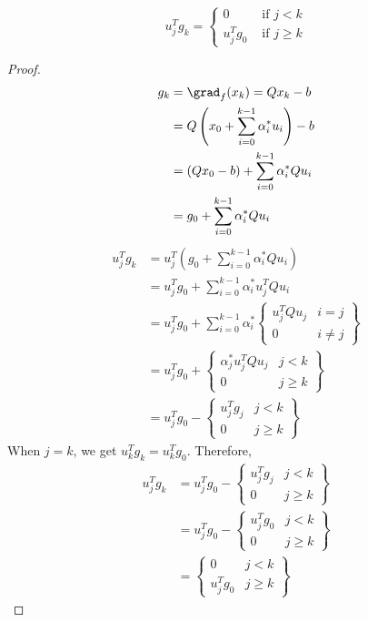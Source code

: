 \begin{theorem}
\label{thm:ug}
\[ u_j^T g_k = \begin{cases}0 & \textrm{ if } j < k \\ u_j^Tg_0 & \textrm{ if } j \ge k \end{cases} \]
\end{theorem}
\begin{proof}
\begin{align*}
g_k &= \grad_f(x_k) = Qx_k - b
\\ &= Q\left(x_0 + \sum_{i=0}^{k-1} \alpha_i^* u_i\right) - b
\\ &= (Qx_0 - b) + \sum_{i=0}^{k-1} \alpha_i^* Qu_i
\\ &= g_0 + \sum_{i=0}^{k-1} \alpha_i^* Qu_i
\end{align*}
\begin{align*}
u_j^Tg_k &= u_j^T\left( g_0 + \sum_{i=0}^{k-1} \alpha_i^* Qu_i \right)
\\ &= u_j^Tg_0 + \sum_{i=0}^{k-1} \alpha_i^* u_j^TQu_i
\\ &= u_j^Tg_0 + \sum_{i=0}^{k-1} \alpha_i^*
    \begin{Bmatrix} u_j^TQu_j & i = j \\ 0 & i\neq j \end{Bmatrix}
\\ &= u_j^Tg_0 + \begin{Bmatrix} \alpha_j^* u_j^TQu_j & j < k \\ 0 & j \ge k \end{Bmatrix}
\\ &= u_j^Tg_0 - \begin{Bmatrix} u_j^Tg_j & j < k \\ 0 & j \ge k \end{Bmatrix}
\end{align*}
When $j = k$, we get $u_k^Tg_k = u_k^Tg_0$. Therefore,
\begin{align*}
u_j^Tg_k &= u_j^Tg_0 - \begin{Bmatrix} u_j^Tg_j & j < k \\ 0 & j \ge k \end{Bmatrix}
\\ &= u_j^Tg_0 - \begin{Bmatrix} u_j^Tg_0 & j < k \\ 0 & j \ge k \end{Bmatrix}
\\ &= \begin{Bmatrix} 0 & j < k \\ u_j^Tg_0 & j \ge k \end{Bmatrix}
\end{align*}
\end{proof}

